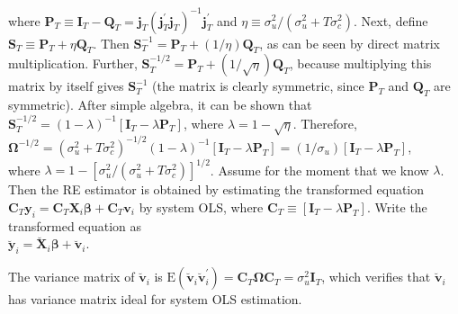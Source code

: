 \documentclass[10pt]{article}
\begin{document}
where $\mathbf{P}_{T} \equiv \mathbf{I}_{T}-\mathbf{Q}_{T}=\mathbf{j}_{T}\left(\mathbf{j}_{T}^{\prime} \mathbf{j}_{T}\right)^{-1} \mathbf{j}_{T}^{\prime}$ and $\eta \equiv \sigma_{u}^{2} /\left(\sigma_{u}^{2}+T \sigma_{c}^{2}\right)$. Next, define $\mathbf{S}_{T} \equiv \mathbf{P}_{T}+\eta \mathbf{Q}_{T}$. Then $\mathbf{S}_{T}^{-1}=\mathbf{P}_{T}+(1 / \eta) \mathbf{Q}_{T}$, as can be seen by direct matrix multiplication. Further, $\mathbf{S}_{T}^{-1 / 2}=\mathbf{P}_{T}+(1 / \sqrt{\eta}) \mathbf{Q}_{T}$, because multiplying this matrix by itself gives $\mathbf{S}_{T}^{-1}$ (the matrix is clearly symmetric, since $\mathbf{P}_{T}$ and $\mathbf{Q}_{T}$ are symmetric). After simple algebra, it can be shown that $\mathbf{S}_{T}^{-1 / 2}=(1-\lambda)^{-1}\left[\mathbf{I}_{T}-\lambda \mathbf{P}_{T}\right]$, where $\lambda=1-\sqrt{\eta}$. Therefore,\\
$\boldsymbol{\Omega}^{-1 / 2}=\left(\sigma_{u}^{2}+T \sigma_{c}^{2}\right)^{-1 / 2}(1-\lambda)^{-1}\left[\mathbf{I}_{T}-\lambda \mathbf{P}_{T}\right]=\left(1 / \sigma_{u}\right)\left[\mathbf{I}_{T}-\lambda \mathbf{P}_{T}\right]$,\\
where $\lambda=1-\left[\sigma_{u}^{2} /\left(\sigma_{u}^{2}+T \sigma_{c}^{2}\right)\right]^{1 / 2}$. Assume for the moment that we know $\lambda$. Then the RE estimator is obtained by estimating the transformed equation $\mathbf{C}_{T} \mathbf{y}_{i}=\mathbf{C}_{T} \mathbf{X}_{i} \boldsymbol{\beta}+ \mathbf{C}_{T} \mathbf{v}_{i}$ by system OLS, where $\mathbf{C}_{T} \equiv\left[\mathbf{I}_{T}-\lambda \mathbf{P}_{T}\right]$. Write the transformed equation as\\
$\breve{\mathbf{y}}_{i}=\breve{\mathbf{X}}_{i} \boldsymbol{\beta}+\breve{\mathbf{v}}_{i}$.

The variance matrix of $\breve{\mathbf{v}}_{i}$ is $\mathrm{E}\left(\breve{\mathbf{v}}_{i} \breve{\mathbf{v}}_{i}^{\prime}\right)=\mathbf{C}_{T} \boldsymbol{\Omega} \mathbf{C}_{T}=\sigma_{u}^{2} \mathbf{I}_{T}$, which verifies that $\breve{\mathbf{v}}_{i}$ has variance matrix ideal for system OLS estimation.
\end{document}
